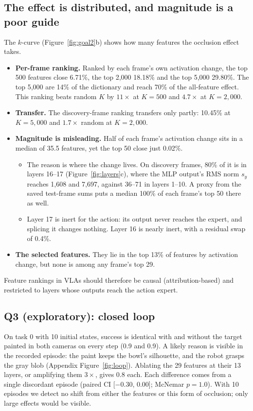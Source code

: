 \documentclass{article} %
\begin{document}
\subsection{The effect is distributed, and magnitude is a poor guide}
\label{sec:dist}
The $k$-curve (Figure~\ref{fig:goal2}b) shows how many features the occlusion effect takes.
\begin{itemize}[leftmargin=*,itemsep=1pt,topsep=2pt]
  \item \textbf{Per-frame ranking.} Ranked by each frame's own activation change, the top 500 features close 6.71\%, the top 2,000 18.18\% and the top 5,000 29.80\%. The top 5,000 are 14\% of the dictionary and reach 70\% of the all-feature effect. This ranking beats random $K$ by $11\times$ at $K{=}500$ and $4.7\times$ at $K{=}2{,}000$.
  \item \textbf{Transfer.} The discovery-frame ranking transfers only partly: 10.45\% at $K{=}5{,}000$ and $1.7\times$ random at $K{=}2{,}000$.
  \item \textbf{Magnitude is misleading.} Half of each frame's activation change sits in a median of 35.5 features, yet the top 50 close just 0.02\%.
  \begin{itemize}[leftmargin=*,itemsep=0pt,topsep=0pt]
    \item The reason is where the change lives. On discovery frames, 80\% of it is in layers 16--17 (Figure~\ref{fig:layers}c), where the MLP output's RMS norm $s_y$ reaches 1,608 and 7,697, against 36--71 in layers 1--10. A proxy from the saved test-frame sums puts a median 100\% of each frame's top 50 there as well.
    \item Layer 17 is inert for the action: its output never reaches the expert, and splicing it changes nothing. Layer 16 is nearly inert, with a residual swap of 0.4\%.
  \end{itemize}
  \item \textbf{The selected features.} They lie in the top 13\% of features by activation change, but none is among any frame's top 29.
\end{itemize}
Feature rankings in VLAs should therefore be causal (attribution-based) and restricted to layers whose outputs reach the action expert.

\subsection{Q3 (exploratory): closed loop}
\label{sec:q3}
On task 0 with 10 initial states, success is identical with and without the target painted in both cameras on every step (0.9 and 0.9). A likely reason is visible in the recorded episode: the paint keeps the bowl's silhouette, and the robot grasps the gray blob (Appendix Figure~\ref{fig:loop}). Ablating the 29 features at their 13 layers, or amplifying them $3\times$, gives 0.8 each. Each difference comes from a single discordant episode (paired CI [$-0.30$, 0.00]; McNemar $p{=}1.0$). With 10 episodes we detect no shift from either the features or this form of occlusion; only large effects would be visible.
\end{document}

